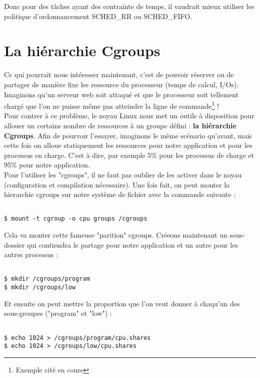 Donc pour des tâches ayant des contrainte de temps, il vaudrait mieux utiliser les politique d'ordonnancement SCHED\_RR ou SCHED\_FIFO.


\pagebreak \section{La hiérarchie Cgroups}

Ce qui pourrait nous intéresser maintenant, c'est de pouvoir réserver ou de partager de manière fixe les ressource du processeur (temps de calcul, I/Os). Imaginons qu'un serveur web soit attaqué et que le processeur soit tellement chargé que l'on ne puisse même pas atteindre la ligne de commande\footnote{Exemple cité en cours} ! \\

Pour contrer à ce problème, le noyau Linux nous met un outils à disposition pour allouer un certains nombre de ressources à un groupe défini : \textbf{la hiérarchie Cgroups}. Afin de pourvoir l'essayer, imaginons le même scénario qu'avant, mais cette fois on alloue statiquement les ressources pour notre application et pour les processus en charge. C'est à dire, par exemple 5\% pour les processus de charge et 95\% pour notre application.\\

Pour l'utiliser les "cgroups", il ne faut pas oublier de les activer dans le noyau (configuration et compilation nécessaire). Une fois fait, on peut monter la hierarchie cgroups sur notre système de fichier avec la commande suivante :

\begin{lstlisting}[frame=single,style=Console]  % Start your code-block

$ mount -t cgroup -o cpu groups /cgroups
\end{lstlisting}

Cela va monter cette fameuse "parition" cgroups. Créeons maintenant un sous-dossier qui contiendra le partage pour notre application et un autre pour les autres processus :

\begin{lstlisting}[frame=single,style=Console]  % Start your code-block

$ mkdir /cgroups/program
$ mkdir /cgroups/low
\end{lstlisting}

Et ensuite on peut mettre la proportion que l'on veut donner à chaqu'un des sous-groupes ("program" et "low") :

\begin{lstlisting}[frame=single,style=Console]  % Start your code-block

$ echo 1024 > /cgroups/program/cpu.shares
$ echo 1024 > /cgroups/low/cpu.shares
\end{lstlisting}

